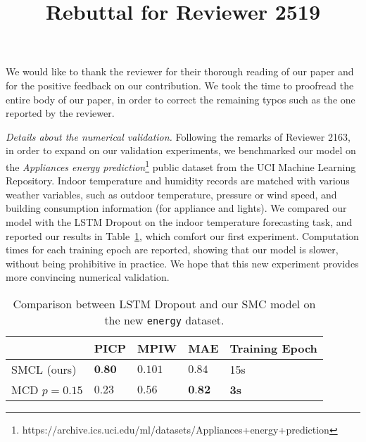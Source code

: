 \documentclass{article}
\title{Rebuttal for Reviewer 2519}
\date{}
\begin{document}

We would like to thank the reviewer for their thorough reading of our paper and for the positive feedback on our contribution.
We took the time to proofread the entire body of our paper, in order to correct the remaining typos such as the one reported by the reviewer.

\textit{Details about the numerical validation.} Following the remarks of Reviewer 2163, in order to expand on our validation experiments, we benchmarked our model on the \textit{Appliances energy prediction}\footnote{https://archive.ics.uci.edu/ml/datasets/Appliances+energy+prediction} public dataset from the UCI Machine Learning Repository.
Indoor temperature and humidity records are matched with various weather variables, such as outdoor temperature, pressure or wind speed, and building consumption information (for appliance and lights).
We compared our model with the LSTM Dropout on the indoor temperature forecasting task, and reported our results in Table~\ref{tab:comparison}, which comfort our first experiment. Computation times for each training epoch are reported, showing that our model is slower, without being prohibitive in practice.
We hope that this new experiment provides more convincing numerical validation.

\begin{table}[htpb]
	\centering
	\caption{Comparison between LSTM Dropout and our SMC model on the new \texttt{energy} dataset.}
	\label{tab:comparison}
	\begin{tabular}{lllll}
		\toprule
		             & PICP            & MPIW    & MAE             & Training Epoch \\
		\toprule
		SMCL (ours)  & $\textbf{0.80}$ & $0.101$ & $0.84$          & 15s            \\
		MCD $p=0.15$ & $0.23$          & $0.56$  & $\textbf{0.82}$ & \textbf{3s}    \\
		\bottomrule
	\end{tabular}
\end{table}





\end{document}
